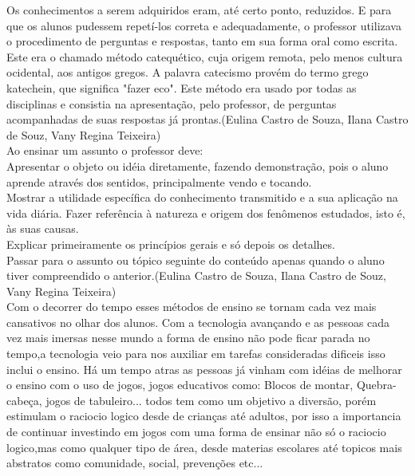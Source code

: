 \documentclass[12pt]{article}
\begin{document}
	Os conhecimentos a serem adquiridos eram, até certo ponto, reduzidos. E para que os alunos pudessem repetí-los correta e adequadamente, o professor utilizava o procedimento de perguntas e respostas, tanto em sua forma oral como escrita. Este era o chamado método catequético, cuja origem remota, pelo menos cultura ocidental, aos antigos gregos. A palavra catecismo provém do termo grego katechein, que significa "fazer eco". Este método era usado por todas as disciplinas e consistia na apresentação, pelo professor, de perguntas acompanhadas de suas respostas já prontas.(Eulina Castro de Souza, Ilana Castro de Souz, Vany Regina Teixeira)\\
	
	Ao ensinar um assunto o professor deve:\\
	
	Apresentar o objeto ou idéia diretamente, fazendo demonstração, pois o aluno aprende através dos sentidos, principalmente vendo e tocando.\\
	
	Mostrar a utilidade específica do conhecimento transmitido e a sua aplicação na vida diária.
	Fazer referência à natureza e origem dos fenômenos estudados, isto é, às suas causas.\\
	
	Explicar primeiramente os princípios gerais e só depois os detalhes.\\
	
	Passar para o assunto ou tópico seguinte do conteúdo apenas quando o aluno tiver compreendido o anterior.(Eulina Castro de Souza, Ilana Castro de Souz, Vany Regina Teixeira)\\
	
	Com o decorrer do tempo esses métodos de ensino se tornam cada vez mais cansativos no olhar dos alunos. Com a tecnologia avançando e as pessoas cada vez mais imersas nesse mundo a forma de ensino não pode ficar parada no tempo,a tecnologia veio para nos auxiliar em tarefas consideradas dificeis isso inclui o ensino. Há um tempo atras as pessoas já vinham com idéias de melhorar o ensino com o uso de jogos, jogos educativos como: Blocos de montar, Quebra-cabeça, jogos de tabuleiro... todos tem como um objetivo a diversão, porém estimulam o raciocio logico desde de crianças até adultos, por isso a importancia de continuar investindo em jogos com uma forma de ensinar não só o raciocio logico,mas como qualquer tipo de área, desde materias escolares até topicos mais abstratos como comunidade, social, prevenções etc...
	
\end{document}
